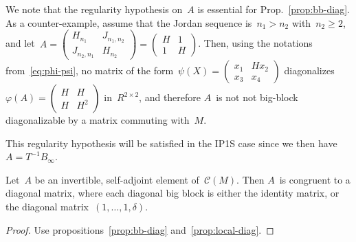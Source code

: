 \documentclass{article}%
\let\ro\mathscr
\def\mat#1{\begin{pmatrix}#1\end{pmatrix}}
\begin{document}
We note that the regularity hypothesis on~$A$ is essential for
Prop.~\ref{prop:bb-diag}. As a counter-example, assume that the Jordan
sequence is~$n_1 > n_2$ with~$n_2 ≥ 2$, and let~$A = \mat{H_{n_1} &
J_{n_1,n_2} \\ J_{n_2,n_1} & H_{n_2}} = \mat{H&1\\1&H}$.
Then, using the notations from~\eqref{eq:phi-psi}, no matrix of the
form~$ψ(X) = \mat{x_1&H x_2\\x_3&x_4}$ diagonalizes~$φ(A) =
\mat{H&H\\H&H^2}$ in~$R^{2×2}$, and therefore $A$~is not not big-block
diagonalizable by a matrix commuting with~$M$.

This regularity hypothesis will be satisfied in the IP1S case since we
then have~$A = T^{-1} B_{∞}$.
\begin{prop}\label{prop:diag}%
Let~$A$ be an invertible, self-adjoint element of~$\ro C(M)$. Then $A$~is
congruent to a diagonal matrix, where each diagonal big block is either
the identity matrix, or the diagonal matrix~$(1, …, 1, δ)$.
\end{prop}

\begin{proof}
Use propositions~\ref{prop:bb-diag} and~\ref{prop:local-diag}.
\end{proof}%

\color{black}
\end{document}
